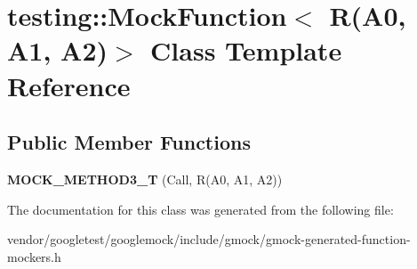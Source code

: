 \hypertarget{classtesting_1_1_mock_function_3_01_r_07_a0_00_01_a1_00_01_a2_08_4}{}\section{testing\+:\+:Mock\+Function$<$ R(A0, A1, A2)$>$ Class Template Reference}
\label{classtesting_1_1_mock_function_3_01_r_07_a0_00_01_a1_00_01_a2_08_4}
\subsection*{Public Member Functions}
\begin{DoxyCompactItemize}
\item 
\mbox{\label{classtesting_1_1_mock_function_3_01_r_07_a0_00_01_a1_00_01_a2_08_4_afcc79eab94b7d873f71ccf7b08ce582f}} 
{\bfseries M\+O\+C\+K\+\_\+\+M\+E\+T\+H\+O\+D3\+\_\+T} (Call, R(A0, A1, A2))
\end{DoxyCompactItemize}


The documentation for this class was generated from the following file\+:\begin{DoxyCompactItemize}
\item 
vendor/googletest/googlemock/include/gmock/gmock-\/generated-\/function-\/mockers.\+h\end{DoxyCompactItemize}
